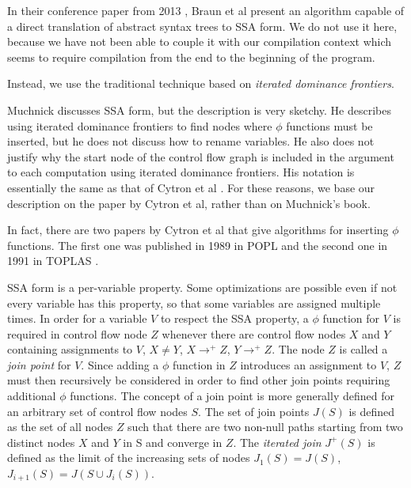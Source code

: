 In their conference paper from 2013
\cite{Braun:2013:SEC:2450247.2450258}, Braun et al present an
algorithm capable of a direct translation of abstract syntax trees to
SSA form.  We do not use it here, because we have not been able to
couple it with our compilation context which seems to require
compilation from the end to the beginning of the program. 

Instead, we use the traditional technique based on \emph{iterated
  dominance frontiers}.

Muchnick \cite{Muchnick:1998:ACD:286076} discusses SSA form, but the
description is very sketchy.  He describes using iterated dominance
frontiers to find nodes where $\phi$ functions must be inserted, but
he does not discuss how to rename variables.  He also does not justify
why the start node of the control flow graph is included in the
argument to each computation using iterated dominance frontiers.  His
notation is essentially the same as that of Cytron et al
\cite{Cytron:1991:ECS:115372.115320}.  For these reasons, we base our
description on the paper by Cytron et al, rather than on Muchnick's
book.

In fact, there are two papers by Cytron et al that give algorithms for
inserting $\phi$ functions.  The first one was published in 1989 in
POPL \cite{Cytron:1989:EMC:75277.75280} and the second one in 1991 in
TOPLAS \cite{Cytron:1991:ECS:115372.115320}.

SSA form is a per-variable property.  Some optimizations are possible
even if not every variable has this property, so that some variables
are assigned multiple times.  In order for a variable $V$ to respect
the SSA property, a $\phi$ function for $V$ is required in control
flow node $Z$ whenever there are control flow nodes $X$ and $Y$
containing assignments to $V$, $X \ne Y$, $X \rightarrow^+ Z$, $Y
\rightarrow^+ Z$.  The node $Z$ is called a \emph{join point} for $V$.
Since adding a $\phi$ function in $Z$ introduces an assignment to $V$,
$Z$ must then recursively be considered in order to find other join
points requiring additional $\phi$ functions.  The concept of a join
point is more generally defined for an arbitrary set of control flow
nodes $S$.  The set of join points $J(S)$ is defined as the set of all
nodes $Z$ such that there are two non-null paths starting from two
distinct nodes $X$ and $Y$ in S and converge in $Z$.  The
\emph{iterated join} $J^+(S)$ is defined as the limit of the
increasing sets of nodes $J_1(S) = J(S)$, $J_{i+1}(S) = J(S \cup
J_i(S))$.

